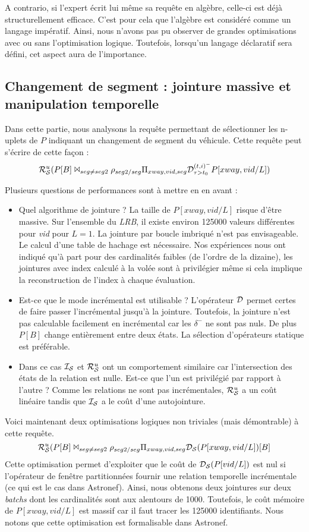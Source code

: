 A contrario, si l'expert écrit lui même sa requête en algèbre, celle-ci est déjà structurellement efficace. C'est pour cela que l'algèbre est considéré comme un langage impératif. Ainsi, nous n'avons pas pu observer de grandes optimisations avec ou sans l'optimisation logique. Toutefois, lorsqu'un langage déclaratif sera défini, cet aspect aura de l'importance.

\subsection{Changement de segment : jointure massive et manipulation temporelle}
Dans cette partie, nous analysons la requête permettant de sélectionner les n-uplets de $P$ indiquant un changement de segment du véhicule. Cette requête peut s'écrire de cette façon : $$\mathcal{R}_{\mathcal S}^{u}(P[B] \Join_{seg\neq seg2} \rho_{seg2/seg} \Pi_{xway,vid,seg} \mathcal{D}^{(t,i)^-}_{\tau>t_0} P[xway,vid/L])$$

Plusieurs questions de performances sont à mettre en en avant :
\begin{itemize}
	\item Quel algorithme de jointure ? La taille de $P[xway,vid/L]$ risque d'être massive. Sur l'ensemble du \textit{LRB}, il existe environ 125000 valeurs différentes pour \textit{vid} pour $L=1$. La jointure par boucle imbriqué n'est pas envisageable. Le calcul d'une table de hachage est nécessaire. Nos expériences nous ont indiqué qu'à part pour des cardinalités faibles (de l'ordre de la dizaine), les jointures avec index calculé à la volée sont à privilégier même si cela implique la reconstruction de l'index à chaque évaluation.
	\item Est-ce que le mode incrémental est utilisable ? L'opérateur $\mathcal{D}$ permet certes de faire passer l'incrémental jusqu'à la jointure. Toutefois, la jointure n'est pas calculable facilement en incrémental car les $\delta^-$ ne sont pas nuls. De plus $P[B]$ change entièrement entre deux états. La sélection d'opérateurs statique est préférable.
	\item Dans ce cas $\mathcal{I_S}$ et $\mathcal{R}_{\mathcal S}^{u}$ ont un comportement similaire car l'intersection des états de la relation est nulle. Est-ce que l'un est privilégié par rapport à l'autre ? Comme les relations ne sont pas incrémentales, $\mathcal{R}_{\mathcal S}^{u}$ a un coût linéaire tandis que $\mathcal{I_S}$ a le coût d'une autojointure.
\end{itemize}

Voici maintenant deux optimisations logiques non triviales (mais démontrable) à cette requête.
$$\mathcal{R}_{\mathcal S}^{u}(P[B] \Join_{seg\neq seg2} \rho_{seg2/seg} \Pi_{xway,vid,seg} \mathcal{D_S}(P[xway,vid/L])[B]$$
Cette optimisation permet d'exploiter que le coût de $\mathcal{D_S}(P[vid/L])$ est nul si l'opérateur de fenêtre partitionnées fournir une relation temporelle incrémentale (ce qui est le cas dans Astronef). Ainsi, nous obtenons deux jointures sur deux \textit{batchs} dont les cardinalités sont aux alentours de 1000. Toutefois, le coût mémoire de $P[xway,vid/L]$ est massif car il faut tracer les 125000 identifiants. Nous notons que cette optimisation est formalisable dans Astronef.


